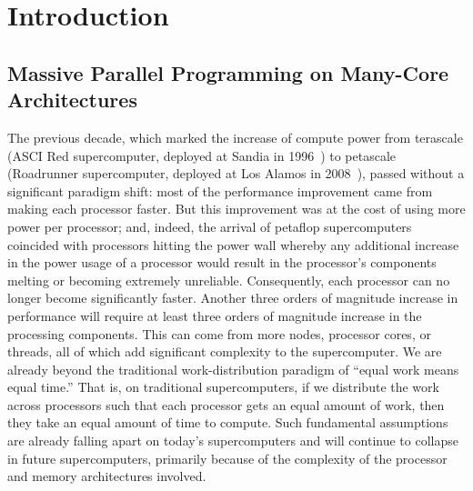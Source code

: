 \chapter{Introduction}\label{sec:intro}

\section{Massive Parallel Programming on Many-Core Architectures}
The previous decade, which marked the increase of compute power from
terascale (ASCI Red supercomputer, deployed at Sandia in 1996~\cite{ascired}) to
petascale (Roadrunner supercomputer, deployed at Los Alamos in 2008~\cite{roadrunner}),
passed without a significant paradigm shift: most of the performance
improvement came from making each processor faster.
But this improvement was at the cost
of using more power per processor; and, indeed, the arrival of
petaflop supercomputers coincided with processors hitting the power
wall whereby any additional increase in the power usage of a processor would
result in the processor's components melting or becoming extremely
unreliable.  Consequently, each processor can no longer become
significantly faster.
Another three orders of magnitude increase
in performance will require at least three orders of magnitude
increase in the processing components.  This can come from
more nodes, processor cores, or threads, all of which add significant complexity to the supercomputer.
We are already beyond the traditional work-distribution paradigm of
``equal work means equal time.''  That is, on traditional
supercomputers, if we distribute the work across processors such that
each processor gets an equal amount of work, then they take an
equal amount of time to compute.  Such fundamental assumptions are
already falling apart on today's supercomputers and will continue to
collapse in future supercomputers, primarily because of the complexity
of the processor and memory architectures involved.

